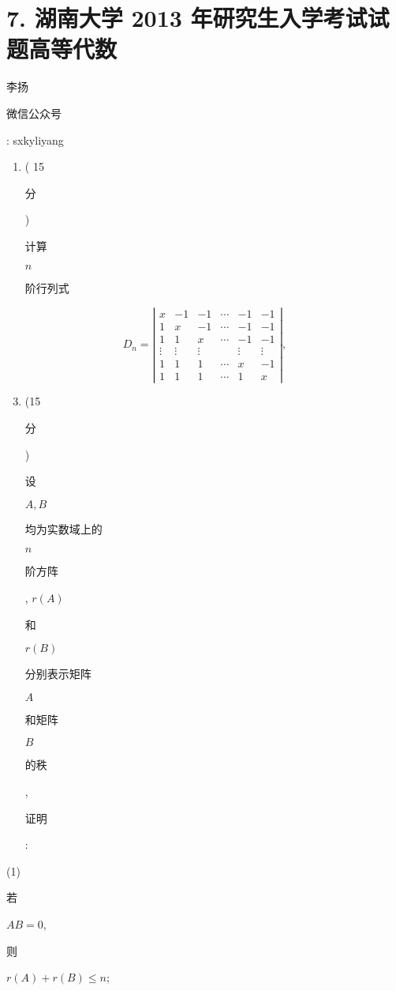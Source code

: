 \documentclass[10pt]{article}
\begin{document}
\section{7. 湖南大学 2013 年研究生入学考试试题高等代数}
\begin{CJK}{UTF8}{mj}李扬\end{CJK}

\begin{CJK}{UTF8}{mj}微信公众号\end{CJK}: sxkyliyang

\begin{enumerate}
  \item ( 15 \begin{CJK}{UTF8}{mj}分\end{CJK}) \begin{CJK}{UTF8}{mj}计算\end{CJK} $n$ \begin{CJK}{UTF8}{mj}阶行列式\end{CJK}
\end{enumerate}
$$
D_{n}=\left|\begin{array}{cccccc}
x & -1 & -1 & \cdots & -1 & -1 \\
1 & x & -1 & \cdots & -1 & -1 \\
1 & 1 & x & \cdots & -1 & -1 \\
\vdots & \vdots & \vdots & & \vdots & \vdots \\
1 & 1 & 1 & \cdots & x & -1 \\
1 & 1 & 1 & \cdots & 1 & x
\end{array}\right|,
$$

\begin{enumerate}
  \setcounter{enumi}{2}
  \item (15 \begin{CJK}{UTF8}{mj}分\end{CJK}) \begin{CJK}{UTF8}{mj}设\end{CJK} $A, B$ \begin{CJK}{UTF8}{mj}均为实数域上的\end{CJK} $n$ \begin{CJK}{UTF8}{mj}阶方阵\end{CJK}, $r(A)$ \begin{CJK}{UTF8}{mj}和\end{CJK} $r(B)$ \begin{CJK}{UTF8}{mj}分别表示矩阵\end{CJK} $A$ \begin{CJK}{UTF8}{mj}和矩阵\end{CJK} $B$ \begin{CJK}{UTF8}{mj}的秩\end{CJK}, \begin{CJK}{UTF8}{mj}证明\end{CJK}:
\end{enumerate}
(1) \begin{CJK}{UTF8}{mj}若\end{CJK} $A B=0$, \begin{CJK}{UTF8}{mj}则\end{CJK} $r(A)+r(B) \leqslant n$;
\end{document}

